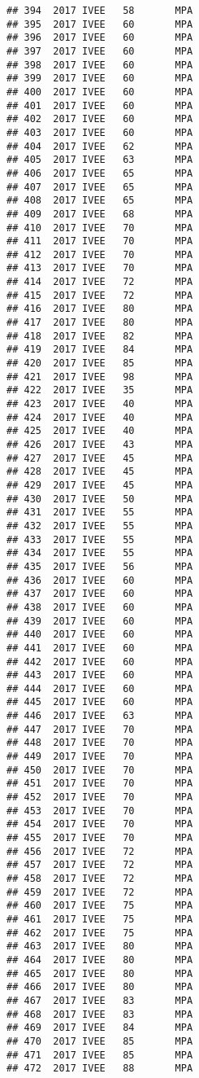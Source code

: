 \documentclass[]{article}
\begin{document}
\begin{verbatim}
## 394  2017 IVEE   58       MPA
## 395  2017 IVEE   60       MPA
## 396  2017 IVEE   60       MPA
## 397  2017 IVEE   60       MPA
## 398  2017 IVEE   60       MPA
## 399  2017 IVEE   60       MPA
## 400  2017 IVEE   60       MPA
## 401  2017 IVEE   60       MPA
## 402  2017 IVEE   60       MPA
## 403  2017 IVEE   60       MPA
## 404  2017 IVEE   62       MPA
## 405  2017 IVEE   63       MPA
## 406  2017 IVEE   65       MPA
## 407  2017 IVEE   65       MPA
## 408  2017 IVEE   65       MPA
## 409  2017 IVEE   68       MPA
## 410  2017 IVEE   70       MPA
## 411  2017 IVEE   70       MPA
## 412  2017 IVEE   70       MPA
## 413  2017 IVEE   70       MPA
## 414  2017 IVEE   72       MPA
## 415  2017 IVEE   72       MPA
## 416  2017 IVEE   80       MPA
## 417  2017 IVEE   80       MPA
## 418  2017 IVEE   82       MPA
## 419  2017 IVEE   84       MPA
## 420  2017 IVEE   85       MPA
## 421  2017 IVEE   98       MPA
## 422  2017 IVEE   35       MPA
## 423  2017 IVEE   40       MPA
## 424  2017 IVEE   40       MPA
## 425  2017 IVEE   40       MPA
## 426  2017 IVEE   43       MPA
## 427  2017 IVEE   45       MPA
## 428  2017 IVEE   45       MPA
## 429  2017 IVEE   45       MPA
## 430  2017 IVEE   50       MPA
## 431  2017 IVEE   55       MPA
## 432  2017 IVEE   55       MPA
## 433  2017 IVEE   55       MPA
## 434  2017 IVEE   55       MPA
## 435  2017 IVEE   56       MPA
## 436  2017 IVEE   60       MPA
## 437  2017 IVEE   60       MPA
## 438  2017 IVEE   60       MPA
## 439  2017 IVEE   60       MPA
## 440  2017 IVEE   60       MPA
## 441  2017 IVEE   60       MPA
## 442  2017 IVEE   60       MPA
## 443  2017 IVEE   60       MPA
## 444  2017 IVEE   60       MPA
## 445  2017 IVEE   60       MPA
## 446  2017 IVEE   63       MPA
## 447  2017 IVEE   70       MPA
## 448  2017 IVEE   70       MPA
## 449  2017 IVEE   70       MPA
## 450  2017 IVEE   70       MPA
## 451  2017 IVEE   70       MPA
## 452  2017 IVEE   70       MPA
## 453  2017 IVEE   70       MPA
## 454  2017 IVEE   70       MPA
## 455  2017 IVEE   70       MPA
## 456  2017 IVEE   72       MPA
## 457  2017 IVEE   72       MPA
## 458  2017 IVEE   72       MPA
## 459  2017 IVEE   72       MPA
## 460  2017 IVEE   75       MPA
## 461  2017 IVEE   75       MPA
## 462  2017 IVEE   75       MPA
## 463  2017 IVEE   80       MPA
## 464  2017 IVEE   80       MPA
## 465  2017 IVEE   80       MPA
## 466  2017 IVEE   80       MPA
## 467  2017 IVEE   83       MPA
## 468  2017 IVEE   83       MPA
## 469  2017 IVEE   84       MPA
## 470  2017 IVEE   85       MPA
## 471  2017 IVEE   85       MPA
## 472  2017 IVEE   88       MPA

\end{verbatim}
\end{document}
